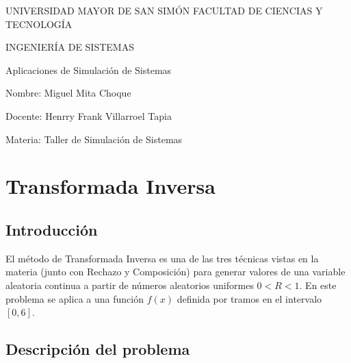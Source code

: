 \documentclass[12pt, a4paper]{article}
\begin{document}
\setlength{\parindent}{0pt}

\begin{titlepage}
\centering
\begin{minipage}{\textwidth}
\end{minipage}
\begin{minipage}{\textwidth}
\centering
\large UNIVERSIDAD MAYOR DE SAN SIMÓN
\large FACULTAD DE CIENCIAS Y TECNOLOGÍA

\large INGENIERÍA DE SISTEMAS
\end{minipage}

\begin{minipage}{\textwidth}
\end{minipage}
\vspace{6cm}

{\huge Aplicaciones de Simulación de Sistemas}
\vfill 

\begin{flushleft}

Nombre: Miguel Mita Choque

Docente: Henrry Frank Villarroel Tapia

Materia: Taller de Simulación de Sistemas

\end{flushleft}

\end{titlepage}

\tableofcontents
\newpage

\setlength{\parskip}{10pt}

\section{Transformada Inversa}

\subsection{Introducción}

El método de Transformada Inversa es una de las tres técnicas vistas en la materia (junto con Rechazo y Composición) para generar valores de una variable aleatoria continua a partir de números aleatorios uniformes $0 < R < 1$. En este problema se aplica a una función $f(x)$ definida por tramos en el intervalo $[0,6]$.

\subsection{Descripción del problema}
\end{document}
